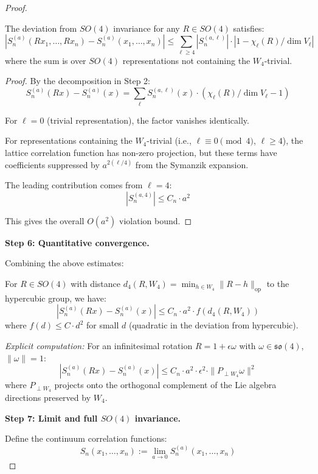 \begin{proof}
\begin{proposition}
\label{prop:so4-violation}
The deviation from $SO(4)$ invariance for any $R \in SO(4)$ satisfies:
\[
\left|S_n^{(a)}(Rx_1, \ldots, Rx_n) - S_n^{(a)}(x_1, \ldots, x_n)\right| 
\leq \sum_{\ell \geq 4} |S_n^{(a,\ell)}| \cdot |1 - \chi_\ell(R)/\dim V_\ell|
\]
where the sum is over $SO(4)$ representations not containing the $W_4$-trivial.
\end{proposition}

\begin{proof}
By the decomposition in Step 2:
\[
S_n^{(a)}(Rx) - S_n^{(a)}(x) = \sum_{\ell} S_n^{(a,\ell)}(x) \cdot 
\left(\chi_\ell(R)/\dim V_\ell - 1\right)
\]

For $\ell = 0$ (trivial representation), the factor vanishes identically.

For representations containing the $W_4$-trivial (i.e., $\ell \equiv 0 \pmod 4$, 
$\ell \geq 4$), the lattice correlation function has non-zero projection, but 
these terms have coefficients suppressed by $a^{2(\ell/4)}$ from the Symanzik expansion.

The leading contribution comes from $\ell = 4$:
\[
|S_n^{(a,4)}| \leq C_n \cdot a^2
\]

This gives the overall $O(a^2)$ violation bound.
\end{proof}

\textbf{Step 6: Quantitative convergence.}

Combining the above estimates:

For $R \in SO(4)$ with distance $d_4(R, W_4) = \min_{h \in W_4}\|R - h\|_{\text{op}}$ 
to the hypercubic group, we have:
\[
\left|S_n^{(a)}(Rx) - S_n^{(a)}(x)\right| \leq C_n \cdot a^2 \cdot f(d_4(R, W_4))
\]
where $f(d) \leq C \cdot d^2$ for small $d$ (quadratic in the deviation from hypercubic).

\textit{Explicit computation:} For an infinitesimal rotation $R = 1 + \epsilon \omega$ 
with $\omega \in \mathfrak{so}(4)$, $\|\omega\|= 1$:
\[
\left|S_n^{(a)}(Rx) - S_n^{(a)}(x)\right| \leq C_n \cdot a^2 \cdot \epsilon^2 
\cdot \|P_{\perp W_4} \omega\|^2
\]
where $P_{\perp W_4}$ projects onto the orthogonal complement of the Lie algebra 
directions preserved by $W_4$.

\textbf{Step 7: Limit and full $SO(4)$ invariance.}

Define the continuum correlation functions:
\[
S_n(x_1, \ldots, x_n) := \lim_{a \to 0} S_n^{(a)}(x_1, \ldots, x_n)
\]


\end{proof}
